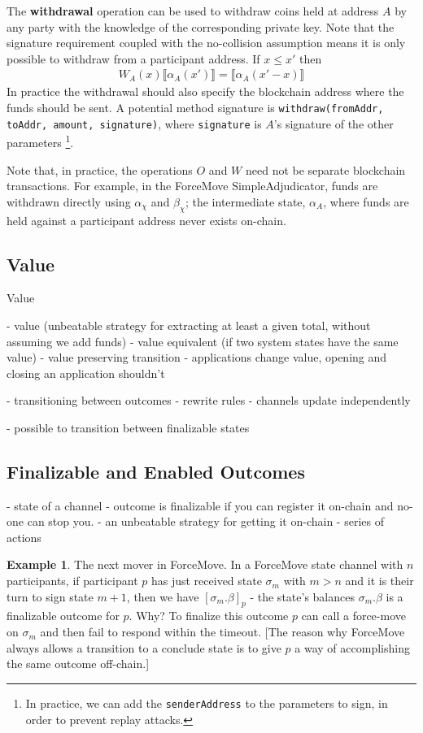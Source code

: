 \documentclass{article}
\theoremstyle{definition}
\newtheorem{example}{Example}[section]
\newcommand{\adj}[1]{\llbracket #1 \rrbracket}
\newcommand{\enf}[1]{[#1]}
\begin{document}
The \textbf{withdrawal} operation can be used to withdraw coins held at address $A$ by any
party with the knowledge of the corresponding private key. 
Note that the signature requirement coupled with the no-collision assumption means
it is only possible to withdraw from a participant address.
If $x \leq x'$ then
\begin{align*}
W_A(x) \adj{\alpha_A(x')} = \adj{\alpha_A(x'-x)}
\end{align*}
In practice the withdrawal should also specify the blockchain address where the funds should be sent.
A potential method signature is \texttt{withdraw(fromAddr, toAddr, amount, signature)}, 
where \texttt{signature} is $A$'s signature of the other parameters
\footnote{In practice, we can add the \texttt{senderAddress} to the parameters to sign,
in order to prevent replay attacks.}.

Note that, in practice, the operations $O$ and $W$ need not be separate blockchain transactions.
For example, in the ForceMove SimpleAdjudicator, funds are withdrawn directly using $\alpha_\chi$ and $\beta_\chi$;
the intermediate state, $\alpha_A$, where funds are held against a participant address never exists on-chain.

\subsection{Value}


Value

- value (unbeatable strategy for extracting at least a given total, without assuming we add funds)
- value equivalent (if two system states have the same value)
- value preserving transition
- applications change value, opening and closing an application shouldn't

- transitioning between outcomes
- rewrite rules
- channels update independently

- possible to transition between finalizable states

\subsection{Finalizable and Enabled Outcomes}

- state of a channel
- outcome is finalizable if you can register it on-chain and no-one can stop you.
- an unbeatable strategy for getting it on-chain
- series of actions

\begin{example}{The next mover in ForceMove.}
  In a ForceMove state channel with $n$ participants, if participant $p$ has just received state $\sigma_m$ with $m > n$ and it is their turn to sign state $m+1$, then we have $\enf{\sigma_m.\beta}_p$ - the state's balances $\sigma_m.\beta$ is a finalizable outcome for $p$.
  Why? To finalize this outcome $p$ can call a force-move on $\sigma_m$ and then fail to respond within
  the timeout. [The reason why ForceMove always allows a transition to a conclude state is to
  give $p$ a way of accomplishing the same outcome off-chain.]
\end{example}
\end{document}
